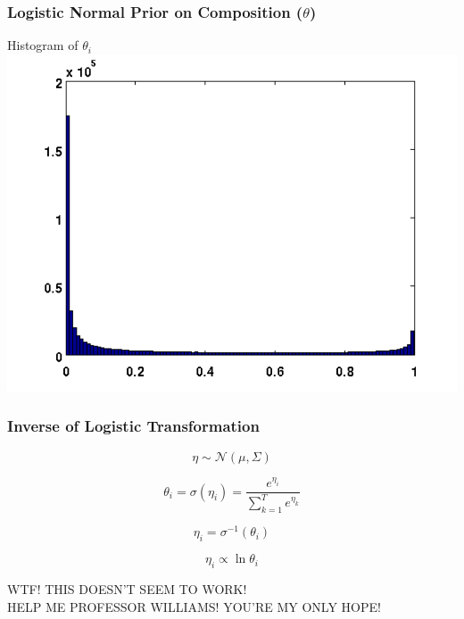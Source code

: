 \documentclass{beamer}
\begin{document}
\begin{frame}
  \frametitle{Logistic Normal Prior on Composition ($\theta$)}
  \begin{center}
    Histogram of $\theta_i$
    \includegraphics[scale=0.6]{img/log-normal-figs/hist-2.png}
  \end{center}
\end{frame}

\begin{frame}
  \frametitle{Inverse of Logistic Transformation}
  \begin{center}
    \begin{equation*}
      \eta \sim \mathcal{N}(\mu, \Sigma)
    \end{equation*}

    \begin{equation*}
      \theta_i = \sigma(\eta_i) = \frac{e^{\eta_i}}{\sum_{k=1}^{T}e^{\eta_k}}
    \end{equation*}

    \begin{equation*}
      \eta_i = \sigma^{-1}(\theta_i)
    \end{equation*}

    \begin{equation*}
      \eta_i \propto \ln \theta_i
    \end{equation*}

    WTF! THIS DOESN'T SEEM TO WORK! \\
    HELP ME PROFESSOR WILLIAMS! YOU'RE MY ONLY HOPE!
  \end{center}
\end{frame}
\end{document}
